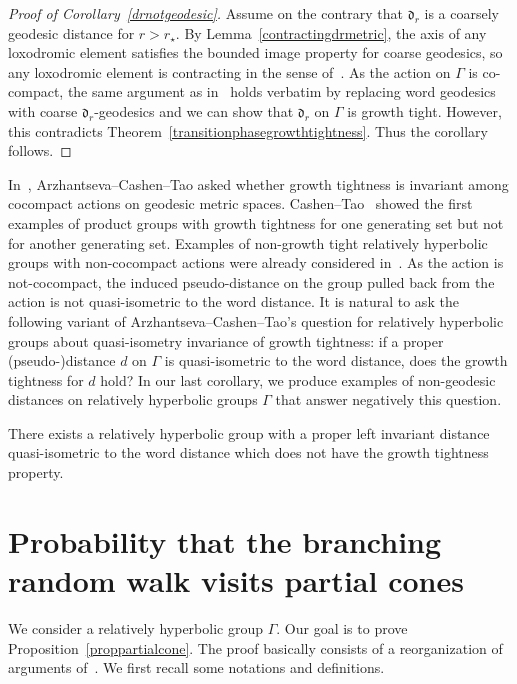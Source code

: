 \documentclass[10pt]{amsart}
\theoremstyle{definition}\newtheorem{defi}[theo]{Definition}\newtheorem{rema}[theo]{Remark}\newtheorem{exam}[theo]{Example}\newtheorem{exem}[theo]{Example}\newtheorem{nota}[theo]{Notation}
\newcommand{\fkd}{\mathfrak{d}}
\begin{document}
\begin{proof}[{Proof of Corollary~\ref{drnotgeodesic}}]
Assume on the contrary that $\fkd_r$ is a coarsely geodesic distance for $r>r_\star$. By Lemma~\ref{contractingdrmetric}, the axis of any loxodromic element satisfies the bounded image property for coarse geodesics, so any loxodromic element is contracting in the sense of~\cite{YangTight}. As the action on $\Gamma$ is co-compact, the same argument as in~\cite{YangTight} holds verbatim by replacing word geodesics with coarse $\fkd_r$-geodesics and we can show that $\fkd_r$ on $\Gamma$ is growth tight. However, this contradicts Theorem~\ref{transitionphasegrowthtightness}. Thus the corollary follows.
\end{proof}

In~\cite[Question 1]{ACT}, Arzhantseva--Cashen--Tao asked whether growth tightness is invariant among cocompact actions on geodesic metric spaces. Cashen--Tao~\cite{CaTao16} showed the first examples of product groups with growth tightness for one generating set but not for another generating set. Examples of non-growth tight relatively hyperbolic groups with non-cocompact actions were already considered in~\cite[Observation~8.8]{ACT}. As the action is not-cocompact, the induced pseudo-distance on the group pulled back from the action is not quasi-isometric to the word distance. It is natural to ask the following variant of Arzhantseva--Cashen--Tao's question for relatively hyperbolic groups about quasi-isometry invariance of growth tightness: if a proper (pseudo-)distance $d$ on $\Gamma$ is quasi-isometric to the word distance, does the growth tightness for $d$ hold? In our last corollary, we produce examples of non-geodesic distances on relatively hyperbolic groups $\Gamma$ that answer negatively this question.
\begin{coro}\label{corgrowthtightness}
There exists a relatively hyperbolic group with a proper left invariant distance quasi-isometric to the word distance which does not have the growth tightness property.
\end{coro}


\appendix
\section{Probability that the branching random walk visits partial cones}\label{app}


We consider a relatively hyperbolic group $\Gamma$. Our goal is to prove Proposition~\ref{proppartialcone}. The proof basically consists of a reorganization of arguments of~\cite{DWY}. We first recall some notations and definitions.
\end{document}
